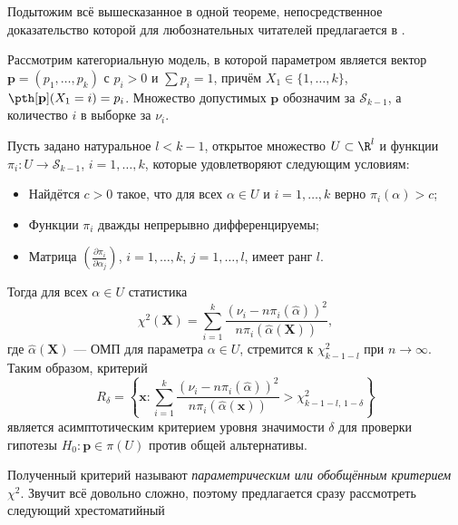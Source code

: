 Подытожим всё вышесказанное в одной теореме, непосредственное доказательство которой для любознательных читателей предлагается в \cite[\S~30.3]{cramer}.
\begin{theorem}[label=complex_chi2_theorem]{}{}
	Рассмотрим категориальную модель, в которой параметром является вектор $\mathbf p = (p_1, \ldots, p_k)$ с $p_i > 0$ и $\sum p_i = 1$, причём $X_1 \in \{1, \ldots, k\}$, $\pth[\mathbf p](X_1 = i) = p_i$. Множество допустимых $\mathbf p$ обозначим за $\mathcal{S}_{k-1}$, а количество $i$ в выборке за $\nu_i$.
	
	Пусть задано натуральное $l < k-1$, открытое множество $U \subset \R^l$ и функции $\pi_i\colon U \to \mathcal{S}_{k-1}$, $i = 1, \ldots, k$, которые удовлетворяют следующим условиям:
	\begin{itemize}
		\item Найдётся $c > 0$ такое, что для всех $\alpha \in U$ и $i = 1, \ldots, k$ верно $\pi_i(\alpha) > c$;
		\item Функции $\pi_i$ дважды непрерывно дифференцируемы;
		\item Матрица $\left(\frac{\partial \pi_i}{\partial \alpha_j}\right)$, $i=1,\ldots, k$, $j=1,\ldots, l$, имеет ранг $l$.
	\end{itemize}
	Тогда для всех $\alpha \in U$ статистика
	\begin{equation}\label{complex_chi2}
		\chi^2(\mathbf X) = \sum_{i=1}^k \frac{(\nu_i - n\pi_i(\widehat{\alpha}))^2}{n\pi_i(\widehat{\alpha}(\mathbf X))},
	\end{equation}
	где $\widehat{\alpha}(\mathbf X)$ --- ОМП для параметра $\alpha \in U$, стремится к $\chi^2_{k-1-l}$ при $n \to \infty$. Таким образом, критерий
	\[
	R_{\delta} = \left\{\mathbf x\colon \sum_{i=1}^k \frac{(\nu_i - n\pi_i(\widehat{\alpha}))^2}{n\pi_i(\widehat{\alpha}(\mathbf x))} > \chi^2_{k-1-l, \, 1 - \delta}\right\}
	\]
	является асимптотическим критерием уровня значимости $\delta$ для проверки гипотезы $H_0 \colon \mathbf p \in \pi(U)$ против общей альтернативы.
\end{theorem}

Полученный критерий называют \textit{параметрическим или обобщённым критерием $\chi^2$}. Звучит всё довольно сложно, поэтому предлагается сразу рассмотреть следующий хрестоматийный

